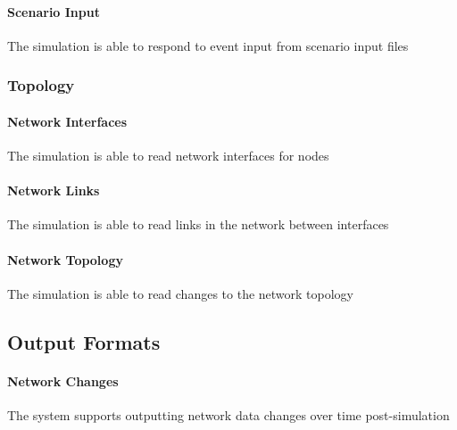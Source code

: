 \documentclass[titlepage]{article}
\begin{document}
	\paragraph{Scenario Input} The simulation is able to respond to event input from scenario input files

\subsubsection{Topology}
    \paragraph{Network Interfaces} The simulation is able to read network interfaces for nodes
    \paragraph{Network Links} The simulation is able to read links in the network between interfaces
    \paragraph{Network Topology} The simulation is able to read changes to the network topology



\subsection{Output Formats%
  \label{output-formats}%
}

    \paragraph{Network Changes} The system supports outputting network data changes over time post-simulation
\end{document}
